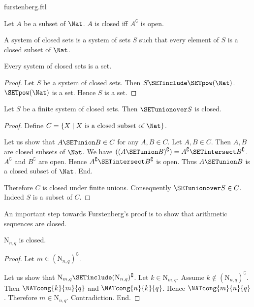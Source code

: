 \documentclass{article}
\newcommand{\N}{\mathrm{N}}
\begin{document}
\begin{smodule}{furstenberg.ftl}
\begin{forthel}
  \begin{definition}
    Let $A$ be a subset of $\Nat$.
    $A$ is closed iff $A^\complement$ is open.
  \end{definition}

  \begin{definition}
    A system of closed sets is a system of sets $S$ such that every element of
    $S$ is a closed subset of $\Nat$.
  \end{definition}

  \begin{lemma}
    Every system of closed sets is a set.
  \end{lemma}
  \begin{proof}
    Let $S$ be a system of closed sets.
    Then $S \SETinclude \SETpow(\Nat)$.
    $\SETpow(\Nat)$ is a set.
    Hence $S$ is a set.
  \end{proof}

  \begin{lemma}
    Let $S$ be a finite system of closed sets.
    Then $\SETunionover S$ is closed.
  \end{lemma}
  \begin{proof}
    Define $C = \{ X \mid X \text{ is a closed subset of } \Nat \}$.

    Let us show that $A \SETunion B \in C$ for any $A, B \in C$.
      Let $A, B \in C$.
      Then $A, B$ are closed subsets of $\Nat$.
      We have $((A \SETunion B)^\complement) = A^\complement \SETintersect B^\complement$. %
      $A^\complement$ and $B^\complement$ are open.
      Hence $A^\complement \SETintersect B^\complement$ is open.
      Thus $A \SETunion B$ is a closed subset of $\Nat$.
    End.

    Therefore $C$ is closed under finite unions.
    Consequently $\SETunionover S \in C$.
    Indeed $S$ is a subset of $C$.
  \end{proof}
\end{forthel}

An important step towards Furstenberg's proof is to show that arithmetic
sequences are closed.

\begin{forthel}
  \begin{lemma}
    $\N_{n, q}$ is closed.
  \end{lemma}
  \begin{proof}
    Let $m \in (\N_{n, q})^\complement$.

    Let us show that $\N_{m, q} \SETinclude (\N_{n, q})^\complement$.
      Let $k \in \N_{m, q}$.
      Assume $k \notin (\N_{n, q})^\complement$.
      Then $\NATcong{k}{m}{q}$ and $\NATcong{n}{k}{q}$.
      Hence $\NATcong{m}{n}{q}$.
      Therefore $m \in \N_{n, q}$.
      Contradiction.
    End.
  \end{proof}
\end{forthel}


\end{smodule}
\end{document}

